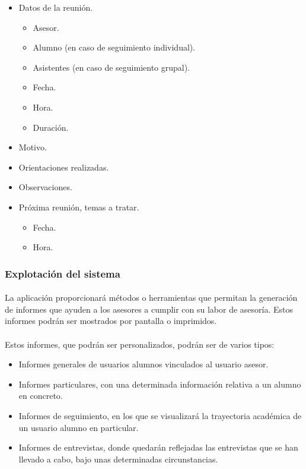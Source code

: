       \begin{itemize}
         \item Datos de la reunión.
         \begin{itemize}
            \item Asesor.
            \item Alumno (en caso de seguimiento individual).
            \item Asistentes (en caso de seguimiento grupal).
            \item Fecha.
            \item Hora.
            \item Duración.
         \end{itemize}
         \item Motivo.
         \item Orientaciones realizadas.
         \item Observaciones.
         \item Próxima reunión, temas a tratar.
         \begin{itemize}
            \item Fecha.
            \item Hora.
         \end{itemize}
      \end{itemize}

      \subsubsection{Explotación del sistema}

      \paragraph{}La aplicación proporcionará métodos o herramientas que
      permitan la generación de informes que ayuden a los asesores a cumplir con
      su labor de asesoría. Estos informes podrán ser mostrados por pantalla o
      imprimidos.

      \paragraph{}Estos informes, que podrán ser personalizados, podrán ser
      de varios tipos:

      \begin{itemize}
       \item Informes generales de usuarios alumnos vinculados al usuario
             asesor.
       \item Informes particulares, con una determinada información relativa a
             un alumno en concreto.
       \item Informes de seguimiento, en los que se visualizará la trayectoria
             académica de un usuario alumno en particular.
       \item Informes de entrevistas, donde quedarán reflejadas las entrevistas
             que se han llevado a cabo, bajo unas determinadas circunstancias.
      \end{itemize}


